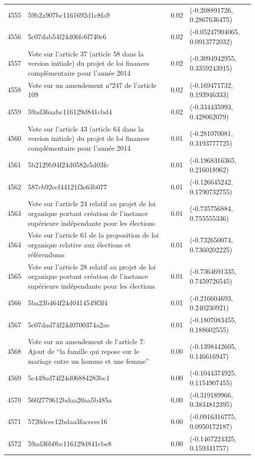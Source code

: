 \begin{table}[ht]
\begin{tabular}{rlrl}
  4555 & 59b2a907bc1161692d1c8fa9 & 0.02 & (-0.208891726, 0.2867636475) \\ 
  4556 & 5c07dab54f24d06fc6f740c6 & 0.02 & (-0.05247904065, 0.0913772032) \\ 
  4557 & Vote sur l'article 37 (article 58 dans la version initiale) du projet de loi finances complémentaire pour l'année 2014 & 0.02 & (-0.3094942955, 0.3359243915) \\ 
  4558 & Vote sur un amendement n°247 de l'article 109 & 0.02 & (-0.169471732, 0.193946333) \\ 
  4559 & 59ad36aabc116129d841cbd4 & 0.02 & (-0.334435993, 0.428062079) \\ 
  4560 & Vote sur l'article 43 (article 64 dans la version initiale) du projet de loi finances complémentaire pour l'année 2014 & 0.01 & (-0.281070081, 0.3193777725) \\ 
  4561 & 5b2129b94f24d0582e5d03fc & 0.01 & (-0.1968316365, 0.216018962) \\ 
  4562 & 587cb92ecf44121f3e63b077 & 0.01 & (-0.126645242, 0.1790732755) \\ 
  4563 & Vote sur l'article 24 relatif au projet de loi organique portant création de l'instance supérieure indépendante pour les élections & 0.01 & (-0.735756884, 0.755555336) \\ 
  4564 & Vote sur l'article 61 de la proposition de loi organique relative aux élections et référendums & 0.01 & (-0.732650074, 0.7360202225) \\ 
  4565 & Vote sur l'article 28 relatif au projet de loi organique portant création de l'instance supérieure indépendante pour les élections & 0.01 & (-0.7364691335, 0.7459726545) \\ 
  4566 & 5ba23b464f24d0414549f3f4 & 0.01 & (-0.216604693, 0.240230921) \\ 
  4567 & 5c07dad74f24d0700374a2ae & 0.01 & (-0.1807083455, 0.188602555) \\ 
  4568 & Vote sur un amendement de l'article 7: Ajout de “la famille qui repose sur le mariage entre un homme et une femme” & 0.00 & (-0.1398442605, 0.146616947) \\ 
  4569 & 5c449ad74f24d06884283bc1 & 0.00 & (-0.1044374925, 0.1154907455) \\ 
  4570 & 5602779612bdaa20aa5b485a & 0.00 & (-0.319189966, 0.3834812395) \\ 
  4571 & 5720dcec12bdaa3facecec16 & 0.00 & (-0.0916316775, 0.0950172187) \\ 
  4572 & 59ad36b0bc116129d841cbe8 & 0.00 & (-0.1467224325, 0.159341757) \\ 

\end{tabular}
\end{table}
